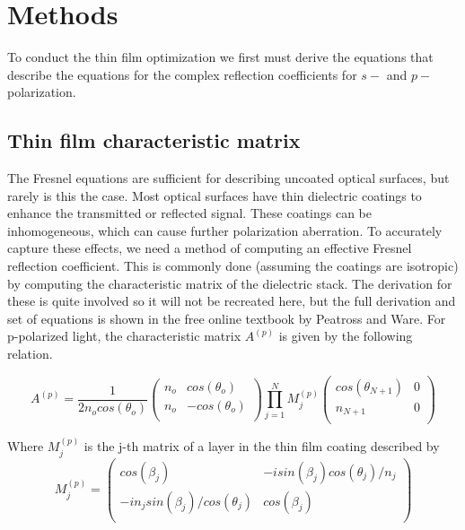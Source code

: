 \section{Methods}
\label{sec:methods}

To conduct the thin film optimization we first must derive the equations that describe the equations for the complex reflection coefficients for $s-$ and $p-$polarization. 

\subsection{Thin film characteristic matrix}
The Fresnel equations are sufficient for describing uncoated optical surfaces, but rarely is this the case. Most optical surfaces have thin dielectric coatings to enhance the transmitted or reflected signal. These coatings can be inhomogeneous, which can cause further polarization aberration. To accurately capture these effects, we need a method of computing an effective Fresnel reflection coefficient. This is commonly done (assuming the coatings are isotropic) by computing the characteristic matrix of the dielectric stack\cite{BYU,Chipman}. The derivation for these is quite involved so it will not be recreated here, but the full derivation and set of equations is shown in the free online textbook by Peatross and Ware\cite{BYU}. For p-polarized light, the characteristic matrix $A^{(p)}$ is given by the following relation.

\begin{equation}
    A^{(p)} = \frac{1}{2n_{o}cos(\theta_{o})}
    \begin{pmatrix}
        n_{o} & cos(\theta_{o}) \\
        n_{o} & -cos(\theta_{o}) \\
    \end{pmatrix}
    \prod_{j=1}^{N} M_{j}^{(p)}
    \begin{pmatrix}
        cos(\theta_{N+1}) & 0 \\
        n_{N+1} & 0 \\
    \end{pmatrix}
\end{equation}

Where $M_{j}^{(p)}$ is the j-th matrix of a layer in the thin film coating described by
\begin{equation}
    M_{j}^{(p)} = 
    \begin{pmatrix}
        cos(\beta_{j}) & -isin(\beta_{j})cos(\theta_{j})/n_{j} \\
        -in_{j}sin(\beta_{j})/cos(\theta_{j}) &  cos(\beta_{j})  \\
    \end{pmatrix}
\end{equation}

